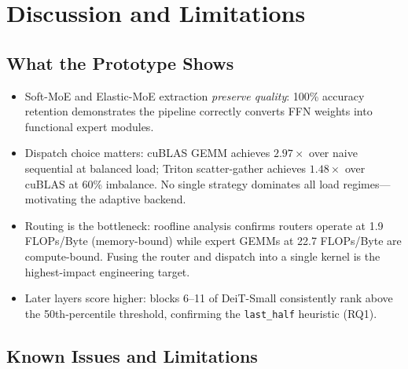 \documentclass[12pt,a4paper]{article}
\begin{document}
\section{Discussion and Limitations}
\label{sec:discussion}

\subsection{What the Prototype Shows}

\begin{itemize}
\item Soft-MoE and Elastic-MoE extraction \emph{preserve quality}: 100\% accuracy retention demonstrates the pipeline correctly converts FFN weights into functional expert modules.
\item Dispatch choice matters: cuBLAS GEMM achieves $2.97\times$ over naive sequential at balanced load; Triton scatter-gather achieves $1.48\times$ over cuBLAS at 60\% imbalance. No single strategy dominates all load regimes—motivating the adaptive backend.
\item Routing is the bottleneck: roofline analysis confirms routers operate at 1.9 FLOPs/Byte (memory-bound) while expert GEMMs at 22.7 FLOPs/Byte are compute-bound. Fusing the router and dispatch into a single kernel is the highest-impact engineering target.
\item Later layers score higher: blocks 6--11 of DeiT-Small consistently rank above the 50th-percentile threshold, confirming the \texttt{last\_half} heuristic (RQ1).
\end{itemize}

\subsection{Known Issues and Limitations}
\end{document}
